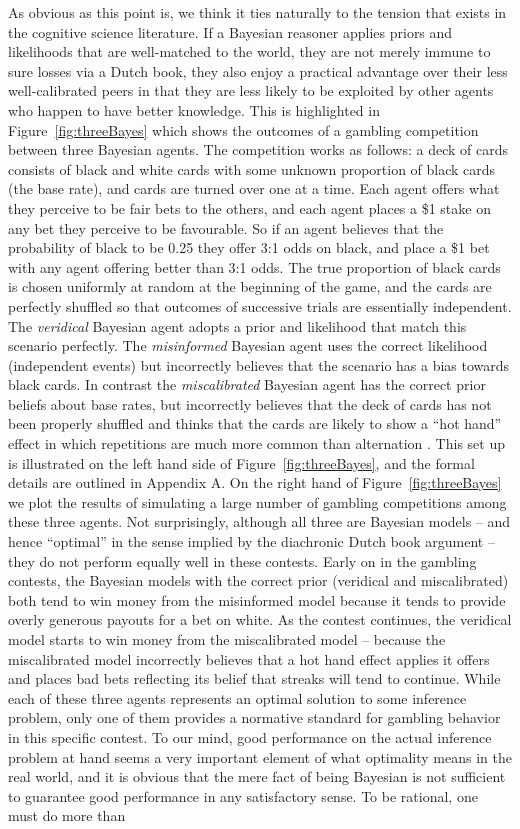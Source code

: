 As obvious as this point is, we think it ties naturally to the tension that exists in the cognitive science literature. If a Bayesian reasoner applies priors and likelihoods that are well-matched to the world, they are not merely immune to sure losses via a Dutch book, they also enjoy a practical advantage over their less well-calibrated peers in that they are less likely to be exploited by other agents who happen to have better knowledge. This is highlighted in Figure~\ref{fig:threeBayes} which shows the outcomes of a gambling competition between three Bayesian agents. The competition works as follows: a deck of cards consists of black and white cards with some unknown proportion of black cards (the base rate), and cards are turned over one at a time. Each agent offers what they perceive to be fair bets to the others, and each agent places a \$1 stake on any bet they perceive to be favourable. So if an agent believes that the probability of black to be 0.25 they offer 3:1 odds on black, and place a \$1 bet with any agent offering better than 3:1 odds. The true proportion of black cards is chosen uniformly at random at the beginning of the game, and the cards are perfectly shuffled so that outcomes of successive trials are essentially independent. The {\it veridical} Bayesian agent adopts a prior and likelihood that match this scenario perfectly. The {\it misinformed} Bayesian agent uses the correct likelihood (independent events) but incorrectly believes that the scenario has a bias towards black cards. In contrast the {\it miscalibrated} Bayesian agent has the correct prior beliefs about base rates, but incorrectly believes that the deck of cards has not been properly shuffled and thinks that the cards are likely to show a ``hot hand'' effect in which repetitions are much more common than alternation \cite{gilovich_hot_1985}. This set up is illustrated on the left hand side of Figure~\ref{fig:threeBayes}, and the formal details are outlined in Appendix A. On the right hand of Figure~\ref{fig:threeBayes} we plot the results of simulating a large number of gambling competitions among these three agents. Not surprisingly, although all three are Bayesian models -- and hence ``optimal'' in the sense implied by the diachronic Dutch book argument -- they do not perform equally well in these contests. Early on in the gambling contests, the Bayesian models with the correct prior (veridical and miscalibrated) both tend to win money from the misinformed model because it tends to provide overly generous payouts for a bet on white. As the contest continues, the veridical model starts to win money from the miscalibrated model -- because the miscalibrated model incorrectly believes that a hot hand effect applies it offers and places bad bets reflecting its belief that streaks will tend to continue. While each of these three agents represents an optimal solution to some inference problem, only one of them provides a normative standard for gambling behavior in this specific contest. To our mind, good performance on the actual inference problem at hand seems a very important element of what optimality means in the real world, and it is obvious that the mere fact of being Bayesian is not sufficient to guarantee good performance in any satisfactory sense. To be rational, one must do more than 